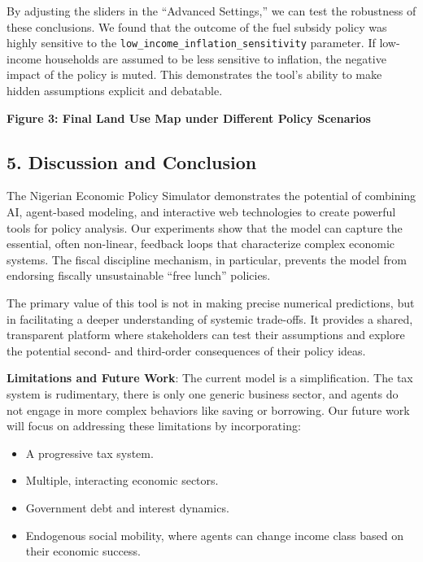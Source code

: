 \documentclass[
]{article}
\makeatletter
\newcommand*\pandocbounded[1]{%
  \sbox\pandoc@box{#1}%
  \Gscale@div\@tempa{\textheight}{\dimexpr\ht\pandoc@box+\dp\pandoc@box\relax}%
  \Gscale@div\@tempb{\linewidth}{\wd\pandoc@box}%
  \ifdim\@tempb\p@<\@tempa\p@\let\@tempa\@tempb\fi%
  \ifdim\@tempa\p@<\p@\scalebox{\@tempa}{\usebox\pandoc@box}%
  \else\usebox{\pandoc@box}%
  \fi%
}
\providecommand{\tightlist}{%
  \setlength{\itemsep}{0pt}\setlength{\parskip}{0pt}}
\makeatother
\begin{document}
By adjusting the sliders in the ``Advanced Settings,'' we can test the
robustness of these conclusions. We found that the outcome of the fuel
subsidy policy was highly sensitive to the
\texttt{low\_income\_inflation\_sensitivity} parameter. If low-income
households are assumed to be less sensitive to inflation, the negative
impact of the policy is muted. This demonstrates the tool's ability to
make hidden assumptions explicit and debatable.

\textbf{Figure 3: Final Land Use Map under Different Policy Scenarios}
\pandocbounded{}

\subsection{5. Discussion and
Conclusion}\label{discussion-and-conclusion}

The Nigerian Economic Policy Simulator demonstrates the potential of
combining AI, agent-based modeling, and interactive web technologies to
create powerful tools for policy analysis. Our experiments show that the
model can capture the essential, often non-linear, feedback loops that
characterize complex economic systems. The fiscal discipline mechanism,
in particular, prevents the model from endorsing fiscally unsustainable
``free lunch'' policies.

The primary value of this tool is not in making precise numerical
predictions, but in facilitating a deeper understanding of systemic
trade-offs. It provides a shared, transparent platform where
stakeholders can test their assumptions and explore the potential
second- and third-order consequences of their policy ideas.

\textbf{Limitations and Future Work}: The current model is a
simplification. The tax system is rudimentary, there is only one generic
business sector, and agents do not engage in more complex behaviors like
saving or borrowing. Our future work will focus on addressing these
limitations by incorporating:

\begin{itemize}
\tightlist
\item
  A progressive tax system.
\item
  Multiple, interacting economic sectors.
\item
  Government debt and interest dynamics.
\item
  Endogenous social mobility, where agents can change income class based
  on their economic success.
\end{itemize}
\end{document}
